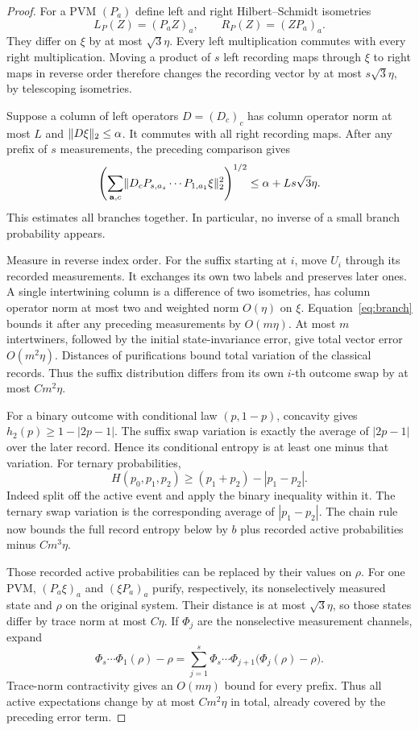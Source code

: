 \begin{proof}
For a PVM $(P_a)$ define left and right Hilbert--Schmidt isometries
\[
 L_P(Z)=(P_aZ)_a,\qquad R_P(Z)=(ZP_a)_a.
\]
They differ on $\xi$ by at most $\sqrt3\eta$. Every left multiplication commutes with every right multiplication. Moving a product of $s$ left recording maps through $\xi$ to right maps in reverse order therefore changes the recording vector by at most $s\sqrt3\eta$, by telescoping isometries.

Suppose a column of left operators $D=(D_c)_c$ has column operator norm at most $L$ and $\lVert D\xi\rVert_2\le\alpha$. It commutes with all right recording maps. After any prefix of $s$ measurements, the preceding comparison gives
\begin{equation}\label{eq:branch}
 \left(\sum_{\mathbf a,c}\lVert D_cP_{s,a_s}\cdots P_{1,a_1}\xi\rVert_2^2\right)^{1/2}
 \le\alpha+Ls\sqrt3\eta.
\end{equation}
This estimates all branches together. In particular, no inverse of a small branch probability appears.

Measure in reverse index order. For the suffix starting at $i$, move $U_i$ through its recorded measurements. It exchanges its own two labels and preserves later ones. A single intertwining column is a difference of two isometries, has column operator norm at most two and weighted norm $O(\eta)$ on $\xi$. Equation~\eqref{eq:branch} bounds it after any preceding measurements by $O(m\eta)$. At most $m$ intertwiners, followed by the initial state-invariance error, give total vector error $O(m^2\eta)$. Distances of purifications bound total variation of the classical records. Thus the suffix distribution differs from its own $i$-th outcome swap by at most $Cm^2\eta$.

For a binary outcome with conditional law $(p,1-p)$, concavity gives $h_2(p)\ge1-|2p-1|$. The suffix swap variation is exactly the average of $|2p-1|$ over the later record. Hence its conditional entropy is at least one minus that variation. For ternary probabilities,
\[
 H(p_0,p_1,p_2)\ge(p_1+p_2)-|p_1-p_2|.
\]
Indeed split off the active event and apply the binary inequality within it. The ternary swap variation is the corresponding average of $|p_1-p_2|$. The chain rule now bounds the full record entropy below by $b$ plus recorded active probabilities minus $Cm^3\eta$.

Those recorded active probabilities can be replaced by their values on $\rho$. For one PVM, $(P_a\xi)_a$ and $(\xi P_a)_a$ purify, respectively, its nonselectively measured state and $\rho$ on the original system. Their distance is at most $\sqrt3\eta$, so those states differ by trace norm at most $C\eta$. If $\Phi_j$ are the nonselective measurement channels, expand
\[
 \Phi_s\cdots\Phi_1(\rho)-\rho
 =\sum_{j=1}^s\Phi_s\cdots\Phi_{j+1}\bigl(\Phi_j(\rho)-\rho\bigr).
\]
Trace-norm contractivity gives an $O(m\eta)$ bound for every prefix. Thus all active expectations change by at most $Cm^2\eta$ in total, already covered by the preceding error term.


\end{proof}
